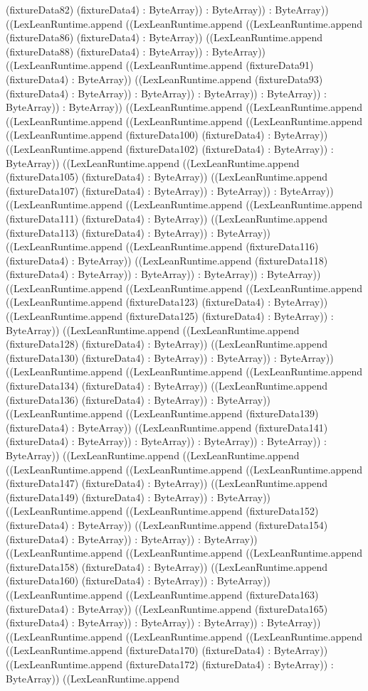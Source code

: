 \documentclass[11pt]{article}
\begin{document}
(fixtureData82) (fixtureData4) : ByteArray)) : ByteArray)) : ByteArray)) ((LexLeanRuntime.append ((LexLeanRuntime.append ((LexLeanRuntime.append (fixtureData86) (fixtureData4) : ByteArray)) ((LexLeanRuntime.append (fixtureData88) (fixtureData4) : ByteArray)) : ByteArray)) ((LexLeanRuntime.append ((LexLeanRuntime.append (fixtureData91) (fixtureData4) : ByteArray)) ((LexLeanRuntime.append (fixtureData93) (fixtureData4) : ByteArray)) : ByteArray)) : ByteArray)) : ByteArray)) : ByteArray)) : ByteArray)) ((LexLeanRuntime.append ((LexLeanRuntime.append ((LexLeanRuntime.append ((LexLeanRuntime.append ((LexLeanRuntime.append ((LexLeanRuntime.append (fixtureData100) (fixtureData4) : ByteArray)) ((LexLeanRuntime.append (fixtureData102) (fixtureData4) : ByteArray)) : ByteArray)) ((LexLeanRuntime.append ((LexLeanRuntime.append (fixtureData105) (fixtureData4) : ByteArray)) ((LexLeanRuntime.append (fixtureData107) (fixtureData4) : ByteArray)) : ByteArray)) : ByteArray)) ((LexLeanRuntime.append ((LexLeanRuntime.append ((LexLeanRuntime.append (fixtureData111) (fixtureData4) : ByteArray)) ((LexLeanRuntime.append (fixtureData113) (fixtureData4) : ByteArray)) : ByteArray)) ((LexLeanRuntime.append ((LexLeanRuntime.append (fixtureData116) (fixtureData4) : ByteArray)) ((LexLeanRuntime.append (fixtureData118) (fixtureData4) : ByteArray)) : ByteArray)) : ByteArray)) : ByteArray)) ((LexLeanRuntime.append ((LexLeanRuntime.append ((LexLeanRuntime.append ((LexLeanRuntime.append (fixtureData123) (fixtureData4) : ByteArray)) ((LexLeanRuntime.append (fixtureData125) (fixtureData4) : ByteArray)) : ByteArray)) ((LexLeanRuntime.append ((LexLeanRuntime.append (fixtureData128) (fixtureData4) : ByteArray)) ((LexLeanRuntime.append (fixtureData130) (fixtureData4) : ByteArray)) : ByteArray)) : ByteArray)) ((LexLeanRuntime.append ((LexLeanRuntime.append ((LexLeanRuntime.append (fixtureData134) (fixtureData4) : ByteArray)) ((LexLeanRuntime.append (fixtureData136) (fixtureData4) : ByteArray)) : ByteArray)) ((LexLeanRuntime.append ((LexLeanRuntime.append (fixtureData139) (fixtureData4) : ByteArray)) ((LexLeanRuntime.append (fixtureData141) (fixtureData4) : ByteArray)) : ByteArray)) : ByteArray)) : ByteArray)) : ByteArray)) ((LexLeanRuntime.append ((LexLeanRuntime.append ((LexLeanRuntime.append ((LexLeanRuntime.append ((LexLeanRuntime.append (fixtureData147) (fixtureData4) : ByteArray)) ((LexLeanRuntime.append (fixtureData149) (fixtureData4) : ByteArray)) : ByteArray)) ((LexLeanRuntime.append ((LexLeanRuntime.append (fixtureData152) (fixtureData4) : ByteArray)) ((LexLeanRuntime.append (fixtureData154) (fixtureData4) : ByteArray)) : ByteArray)) : ByteArray)) ((LexLeanRuntime.append ((LexLeanRuntime.append ((LexLeanRuntime.append (fixtureData158) (fixtureData4) : ByteArray)) ((LexLeanRuntime.append (fixtureData160) (fixtureData4) : ByteArray)) : ByteArray)) ((LexLeanRuntime.append ((LexLeanRuntime.append (fixtureData163) (fixtureData4) : ByteArray)) ((LexLeanRuntime.append (fixtureData165) (fixtureData4) : ByteArray)) : ByteArray)) : ByteArray)) : ByteArray)) ((LexLeanRuntime.append ((LexLeanRuntime.append ((LexLeanRuntime.append ((LexLeanRuntime.append (fixtureData170) (fixtureData4) : ByteArray)) ((LexLeanRuntime.append (fixtureData172) (fixtureData4) : ByteArray)) : ByteArray)) ((LexLeanRuntime.append 
\end{document}
